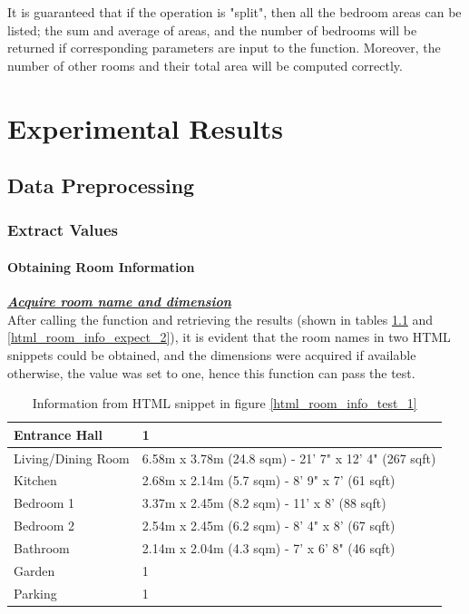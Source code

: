 \documentclass[12pt,twoside]{report}
\begin{document}
It is guaranteed that if the operation is  "split", then all the bedroom areas can be listed; the sum and average of areas, and the number of bedrooms will be returned if corresponding parameters are input to the function. Moreover, the number of other rooms and their total area will be computed correctly. 

\chapter{Experimental Results}

\section{Data Preprocessing}

\subsection{Extract Values}

\subsubsection{Obtaining Room Information}
\textbf{\textit{\underline{Acquire room name and dimension}}} \\
After calling the function and retrieving the results (shown in tables \ref{html_room_info_expect_1} and \ref{html_room_info_expect_2}), it is evident that the room names in two HTML snippets could be obtained, and the dimensions were acquired if available otherwise, the value was set to one, hence this function can pass the test.
\begin{table}[h]
	\centering
	\caption{Information from HTML snippet in figure \ref{html_room_info_test_1}}
	\begin{tabular} {| l | l |}
		\hline
		Entrance Hall & 1\\
		\hline
		Living/Dining Room & 6.58m x 3.78m (24.8 sqm) - 21' 7" x 12' 4" (267 sqft)\\
		\hline
		Kitchen & 2.68m x 2.14m (5.7 sqm) - 8' 9" x 7' (61 sqft)\\
		\hline
		Bedroom 1 & 3.37m x 2.45m (8.2 sqm) - 11' x 8' (88 sqft)\\
		\hline
		Bedroom 2 & 2.54m x 2.45m (6.2 sqm) - 8' 4" x 8' (67 sqft)\\
		\hline 
		Bathroom & 2.14m x 2.04m (4.3 sqm) - 7' x 6' 8" (46 sqft)\\
		\hline
		Garden & 1\\
		\hline
		Parking & 1\\
		\hline
	\end{tabular}
	\label{html_room_info_expect_1}
\end{table}
\end{document}
